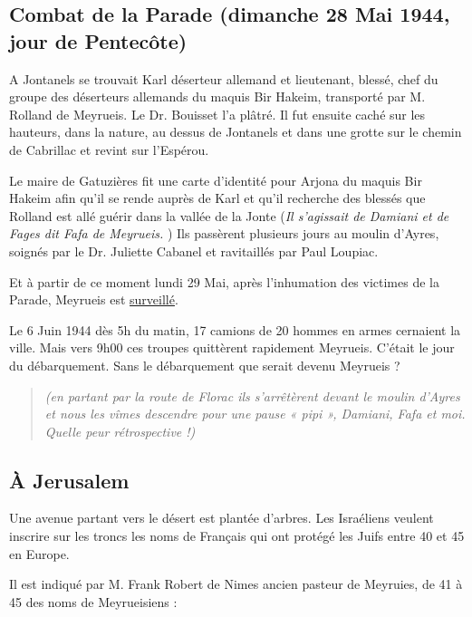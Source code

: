 \medskip

\subsection{Combat de la Parade (dimanche 28 Mai 1944, jour de Pentecôte)}

A Jontanels se trouvait Karl déserteur allemand et lieutenant, blessé, chef du groupe des
déserteurs allemands du maquis Bir Hakeim, transporté par M. Rolland de Meyrueis. Le Dr.
Bouisset l’a plâtré. Il fut ensuite caché sur les hauteurs, dans la nature, au dessus de Jontanels
et dans une grotte sur le chemin de Cabrillac et revint sur l’Espérou.

\medskip

Le maire de Gatuzières fit une carte d’identité pour Arjona du maquis Bir Hakeim afin qu’il
se rende auprès de Karl et qu’il recherche des blessés que Rolland est allé guérir dans la vallée
de la Jonte (\textit{Il s’agissait de Damiani et de Fages dit Fafa de Meyrueis.} ) Ils passèrent
plusieurs jours au moulin d’Ayres, soignés par le Dr. Juliette Cabanel et ravitaillés par Paul
Loupiac.

Et à partir de ce moment lundi 29 Mai, après l’inhumation des victimes de la Parade,
Meyrueis est \underline{surveillé}.

Le 6 Juin 1944 dès 5h du matin, 17 camions de 20 hommes en armes cernaient la ville. Mais
vers 9h00 ces troupes quittèrent rapidement Meyrueis. C’était le jour du débarquement. Sans
le débarquement que serait devenu Meyrueis ?

\begin{quote}
\textit{(en partant par la route de Florac ils s’arrêtèrent devant le moulin d’Ayres et nous les vîmes
descendre pour une pause « pipi », Damiani, Fafa et moi. Quelle peur rétrospective !)}
\end{quote}

\medskip

\subsection{À Jerusalem}

\medskip

Une avenue partant vers le désert est plantée d’arbres. Les Israéliens veulent inscrire sur les
troncs les noms de Français qui ont protégé les Juifs entre 40 et 45 en Europe.

\medskip

Il est indiqué par M. Frank Robert de Nimes ancien pasteur de Meyruies, de 41 à 45 des
noms de Meyrueisiens :

